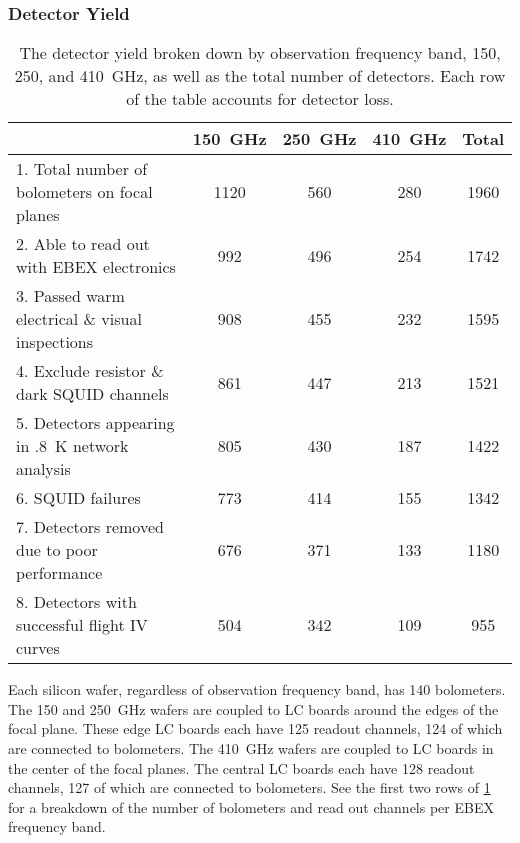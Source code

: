 \documentclass[../EBEXPaper2.tex]{subfiles}
\begin{document}
\subsubsection{Detector Yield}
\label{sec:yield}



\begin{table}[ht!]
\begin{center}
\begin{tabular}{l|c|c|c|c}
  & 150~GHz & 250~GHz & 410~GHz & Total \\
\hline 1. Total number of bolometers on focal planes & 1120 & 560 & 280 & 1960 \\
\hline 2. Able to read out with \ac{EBEX} electronics & 992 & 496 & 254 & 1742 \\
\hline 3. Passed warm electrical \& visual inspections & 908 & 455 & 232 & 1595 \\
\hline 4. Exclude resistor \& dark \ac{SQUID} channels & 861 & 447 & 213 & 1521 \\
\hline 5. Detectors appearing in .8~K network analysis & 805 & 430 & 187 & 1422 \\
\hline 6. \ac{SQUID} failures & 773 & 414 & 155 & 1342 \\
\hline 7. Detectors removed due to poor performance & 676 & 371 & 133 & 1180 \\
\hline 8. Detectors with successful flight IV curves & 504 & 342 & 109 & 955 \\
\hline
\end{tabular}
\end{center}
\caption{The detector yield broken down by observation frequency band, 150, 250, and 410~GHz, as well as the total number of detectors. Each row of the table accounts for detector loss.}
\label{yield_table}
\end{table}%



Each silicon wafer, regardless of observation frequency band, has 140 bolometers. %
The 150 and 250~GHz wafers are coupled to \ac{LC} boards around the edges of the focal plane. These edge \ac{LC} boards each have 125 readout channels, 124 of which are connected to bolometers. %
The 410~GHz wafers are coupled to \ac{LC} boards in the center of the focal planes. The central \ac{LC} boards each have 128 readout channels, 127 of which are connected to bolometers. %
See the first two rows of \TAB\ref{yield_table} for a breakdown of the number of bolometers and read out channels per \ac{EBEX} frequency band. 
\end{document}
